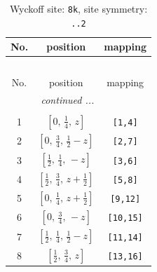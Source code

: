 \documentclass[fleqn,8pt]{jsarticle}
\begin{document}
\begin{longtable}{ccc}
\caption{Wyckoff site: {\tt 8k}, site symmetry: {\tt ..2}}
 \\
 \hline \hline
No. & position & mapping \\ \hline \endfirsthead

\multicolumn{2}{l}{\tablename\ \thetable{}} \\
 \hline \hline
No. & position & mapping \\ \hline \endhead

 \hline \hline
\multicolumn{2}{r}{\footnotesize\it continued ...} \\ \endfoot

 \hline \hline
\multicolumn{2}{r}{} \\ \endlastfoot

1 & $\left[ 0,\, \frac{1}{4},\, z \right]$ & {\tt [1,4]} \\ \hline
2 & $\left[ 0,\, \frac{3}{4},\, \frac{1}{2} - z \right]$ & {\tt [2,7]} \\ \hline
3 & $\left[ \frac{1}{2},\, \frac{1}{4},\, - z \right]$ & {\tt [3,6]} \\ \hline
4 & $\left[ \frac{1}{2},\, \frac{3}{4},\, z + \frac{1}{2} \right]$ & {\tt [5,8]} \\ \hline
5 & $\left[ 0,\, \frac{1}{4},\, z + \frac{1}{2} \right]$ & {\tt [9,12]} \\ \hline
6 & $\left[ 0,\, \frac{3}{4},\, - z \right]$ & {\tt [10,15]} \\ \hline
7 & $\left[ \frac{1}{2},\, \frac{1}{4},\, \frac{1}{2} - z \right]$ & {\tt [11,14]} \\ \hline
8 & $\left[ \frac{1}{2},\, \frac{3}{4},\, z \right]$ & {\tt [13,16]} \\
\end{longtable}
\renewcommand{\arraystretch}{1.2}
\end{document}
